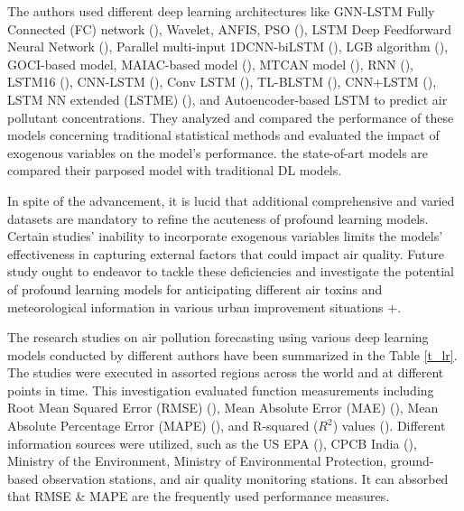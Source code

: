 \documentclass[a4paper,fleqn]{cas-sc}
\begin{document}
The authors used different deep learning architectures like GNN-LSTM Fully Connected (FC) network (\cite{li2023nested}), Wavelet, ANFIS, PSO (\cite{pruthi2022low}), LSTM Deep Feedforward Neural Network (\cite{menares2021forecasting}), Parallel multi-input 1DCNN-biLSTM (\cite{zhu2023deep}), LGB algorithm (\cite{kim2022short}), GOCI-based model, MAIAC-based model (\cite{lee2021potential}), MTCAN model (\cite{samal2021multi}), RNN (\cite{kurnaz2022prediction}), LSTM16 (\cite{das2022prediction}), CNN-LSTM (\cite{natsagdorj2023prediction}), Conv LSTM (\cite{zhu2023deep}), TL-BLSTM (\cite{ma2019improving}), CNN+LSTM (\cite{qin2019novel}), LSTM NN extended (LSTME) (\cite{li2017long}), and Autoencoder-based LSTM to predict air pollutant concentrations. They analyzed and compared the performance of these models concerning traditional statistical methods and evaluated the impact of exogenous variables on the model's performance. the state-of-art models are compared their parposed model with traditional DL models.

In spite of the advancement, it is lucid that additional comprehensive and varied datasets are mandatory to refine the acuteness of profound learning models. Certain studies' inability to incorporate exogenous variables limits the models' effectiveness in capturing external factors that could impact air quality. Future study ought to endeavor to tackle these deficiencies and investigate the potential of profound learning models for anticipating different air toxins and meteorological information in various urban improvement situations $+$.

The research studies on air pollution forecasting using various deep learning models conducted by different authors have been summarized in the Table \ref{t_lr}. The studies were executed in assorted regions across the world and at different points in time. This investigation evaluated function measurements including Root Mean Squared Error (RMSE) (\cite{das2022prediction,kurnaz2022prediction,samal2021multi,kim2022short,zhu2023investigation,menares2021forecasting,nath2021long,du2019deep,li2017long,qin2019novel,ma2019improving,natsagdorj2023prediction}), Mean Absolute Error (MAE) (\cite{li2023nested,menares2021forecasting,zhu2023investigation,ma2019improving,nath2021long,du2019deep,li2017long}), Mean Absolute Percentage Error (MAPE) (\cite{li2017long,ma2019improving}), and R-squared ($R^2$) values (\cite{eren2023predicting,lee2021potential,kim2022short,zhu2023investigation,menares2021forecasting}). Different information sources were utilized, such as the US EPA (\cite{li2023nested}), CPCB India (\cite{nath2021long,samal2021multi,pruthi2022low}), Ministry of the Environment, Ministry of Environmental Protection, ground-based observation stations, and air quality monitoring stations. It can absorbed that RMSE \& MAPE are the frequently used performance measures.
 
\end{document}
